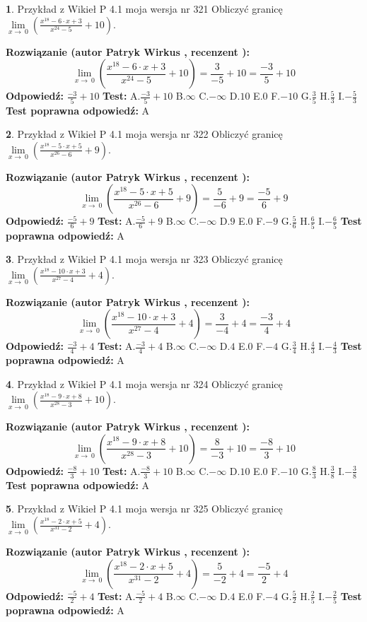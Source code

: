 \documentclass[12pt, a4paper]{article}
\theoremstyle{definition} %
\newtheorem{zad}{}
\newcommand{\zadStart}[1]{\begin{zad}#1\newline}
\newcommand{\zadStop}{\end{zad}}
\newcommand{\rozwStart}[2]{\noindent \textbf{Rozwiązanie (autor #1 , recenzent #2): }\newline}
\newcommand{\rozwStop}{\newline}
\newcommand{\odpStart}{\noindent \textbf{Odpowiedź:}\newline}
\newcommand{\odpStop}{\newline}
\newcommand{\testStart}{\noindent \textbf{Test:}\newline}
\newcommand{\testStop}{\newline}
\newcommand{\kluczStart}{\noindent \textbf{Test poprawna odpowiedź:}\newline}
\newcommand{\kluczStop}{\newline}
\begin{document}
\zadStart{Przykład z Wikieł P 4.1 moja wersja nr 321}
Obliczyć granicę $\lim\limits_{x\to\ 0}(\frac{x^{18}-6 \cdot x +3}{x^{24}-5}+10)$.
\zadStop
\rozwStart{Patryk Wirkus}{}
$$\lim\limits_{x\to\ 0}(\frac{x^{18}-6 \cdot x +3}{x^{24}-5}+10)=\frac{3}{-5}+10=\frac{-3}{5}+10$$
\rozwStop
\odpStart
$\frac{-3}{5}+10$
\odpStop
\testStart
A.$\frac{-3}{5}+10$
B.$\infty$
C.$-\infty$
D.$10$
E.$0$
F.$-10$
G.$\frac{3}{5}$
H.$\frac{5}{3}$
I.$-\frac{5}{3}$
\testStop
\kluczStart
A
\kluczStop



\zadStart{Przykład z Wikieł P 4.1 moja wersja nr 322}
Obliczyć granicę $\lim\limits_{x\to\ 0}(\frac{x^{18}-5 \cdot x +5}{x^{26}-6}+9)$.
\zadStop
\rozwStart{Patryk Wirkus}{}
$$\lim\limits_{x\to\ 0}(\frac{x^{18}-5 \cdot x +5}{x^{26}-6}+9)=\frac{5}{-6}+9=\frac{-5}{6}+9$$
\rozwStop
\odpStart
$\frac{-5}{6}+9$
\odpStop
\testStart
A.$\frac{-5}{6}+9$
B.$\infty$
C.$-\infty$
D.$9$
E.$0$
F.$-9$
G.$\frac{5}{6}$
H.$\frac{6}{5}$
I.$-\frac{6}{5}$
\testStop
\kluczStart
A
\kluczStop



\zadStart{Przykład z Wikieł P 4.1 moja wersja nr 323}
Obliczyć granicę $\lim\limits_{x\to\ 0}(\frac{x^{18}-10 \cdot x +3}{x^{27}-4}+4)$.
\zadStop
\rozwStart{Patryk Wirkus}{}
$$\lim\limits_{x\to\ 0}(\frac{x^{18}-10 \cdot x +3}{x^{27}-4}+4)=\frac{3}{-4}+4=\frac{-3}{4}+4$$
\rozwStop
\odpStart
$\frac{-3}{4}+4$
\odpStop
\testStart
A.$\frac{-3}{4}+4$
B.$\infty$
C.$-\infty$
D.$4$
E.$0$
F.$-4$
G.$\frac{3}{4}$
H.$\frac{4}{3}$
I.$-\frac{4}{3}$
\testStop
\kluczStart
A
\kluczStop



\zadStart{Przykład z Wikieł P 4.1 moja wersja nr 324}
Obliczyć granicę $\lim\limits_{x\to\ 0}(\frac{x^{18}-9 \cdot x +8}{x^{28}-3}+10)$.
\zadStop
\rozwStart{Patryk Wirkus}{}
$$\lim\limits_{x\to\ 0}(\frac{x^{18}-9 \cdot x +8}{x^{28}-3}+10)=\frac{8}{-3}+10=\frac{-8}{3}+10$$
\rozwStop
\odpStart
$\frac{-8}{3}+10$
\odpStop
\testStart
A.$\frac{-8}{3}+10$
B.$\infty$
C.$-\infty$
D.$10$
E.$0$
F.$-10$
G.$\frac{8}{3}$
H.$\frac{3}{8}$
I.$-\frac{3}{8}$
\testStop
\kluczStart
A
\kluczStop



\zadStart{Przykład z Wikieł P 4.1 moja wersja nr 325}
Obliczyć granicę $\lim\limits_{x\to\ 0}(\frac{x^{18}-2 \cdot x +5}{x^{31}-2}+4)$.
\zadStop
\rozwStart{Patryk Wirkus}{}
$$\lim\limits_{x\to\ 0}(\frac{x^{18}-2 \cdot x +5}{x^{31}-2}+4)=\frac{5}{-2}+4=\frac{-5}{2}+4$$
\rozwStop
\odpStart
$\frac{-5}{2}+4$
\odpStop
\testStart
A.$\frac{-5}{2}+4$
B.$\infty$
C.$-\infty$
D.$4$
E.$0$
F.$-4$
G.$\frac{5}{2}$
H.$\frac{2}{5}$
I.$-\frac{2}{5}$
\testStop
\kluczStart
A
\kluczStop
\end{document}
